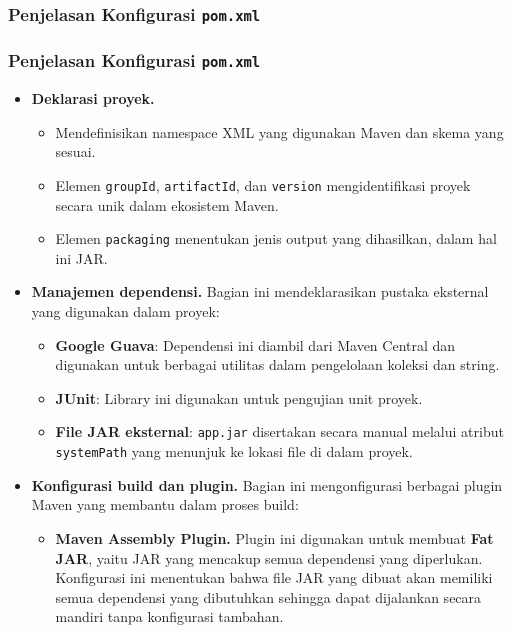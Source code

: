 \subsubsection{Penjelasan Konfigurasi \texttt{pom.xml}}

\subsubsection{Penjelasan Konfigurasi \texttt{pom.xml}}

\begin{itemize}
	\item \textbf{Deklarasi proyek.}  
	\begin{itemize}
		\item Mendefinisikan namespace XML yang digunakan Maven dan skema yang sesuai.
		\item Elemen \texttt{groupId}, \texttt{artifactId}, dan \texttt{version} mengidentifikasi proyek secara unik dalam ekosistem Maven.
		\item Elemen \texttt{packaging} menentukan jenis output yang dihasilkan, dalam hal ini JAR.
	\end{itemize}
	
	\item \textbf{Manajemen dependensi.}  
	Bagian ini mendeklarasikan pustaka eksternal yang digunakan dalam proyek:
	\begin{itemize}
		\item \textbf{Google Guava}: Dependensi ini diambil dari Maven Central dan digunakan untuk berbagai utilitas dalam pengelolaan koleksi dan string.
		\item \textbf{JUnit}: Library ini digunakan untuk pengujian unit proyek.
		\item \textbf{File JAR eksternal}: \texttt{app.jar} disertakan secara manual melalui atribut \texttt{systemPath} yang menunjuk ke lokasi file di dalam proyek.
	\end{itemize}
	
	\item \textbf{Konfigurasi build dan plugin.}  
	Bagian ini mengonfigurasi berbagai plugin Maven yang membantu dalam proses build:
	\begin{itemize}
		\item \textbf{Maven Assembly Plugin.}  
		Plugin ini digunakan untuk membuat \textbf{Fat JAR}, yaitu JAR yang mencakup semua dependensi yang diperlukan. Konfigurasi ini menentukan bahwa file JAR yang dibuat akan memiliki semua dependensi yang dibutuhkan sehingga dapat dijalankan secara mandiri tanpa konfigurasi tambahan.
		

\end{itemize}
\end{itemize}
